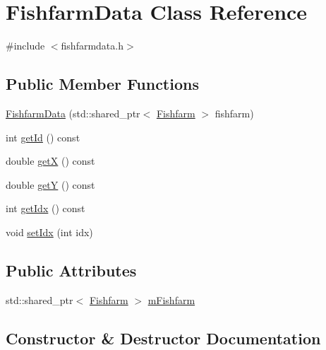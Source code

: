 \hypertarget{class_fishfarm_data}{}\section{Fishfarm\+Data Class Reference}
\label{class_fishfarm_data}


{\ttfamily \#include $<$fishfarmdata.\+h$>$}

\subsection*{Public Member Functions}
\begin{DoxyCompactItemize}
\item 
\mbox{\hyperlink{class_fishfarm_data_a05721893e565ef3870ab331159bc1b34}{Fishfarm\+Data}} (std\+::shared\+\_\+ptr$<$ \mbox{\hyperlink{class_fishfarm}{Fishfarm}} $>$ fishfarm)
\item 
int \mbox{\hyperlink{class_fishfarm_data_a712a5fa81604d4a888a6314b5e3decc2}{get\+Id}} () const
\item 
double \mbox{\hyperlink{class_fishfarm_data_acdaed3df25a88e94c7eaeb5dead7fba9}{getX}} () const
\item 
double \mbox{\hyperlink{class_fishfarm_data_a98adbc6e4567e9248c6b594a3fff7242}{getY}} () const
\item 
int \mbox{\hyperlink{class_fishfarm_data_a4a59751310f4142c90b62df12dcc85b9}{get\+Idx}} () const
\item 
void \mbox{\hyperlink{class_fishfarm_data_a2023a1d96ff75a5ae0eb2c076accd71b}{set\+Idx}} (int idx)
\end{DoxyCompactItemize}
\subsection*{Public Attributes}
\begin{DoxyCompactItemize}
\item 
std\+::shared\+\_\+ptr$<$ \mbox{\hyperlink{class_fishfarm}{Fishfarm}} $>$ \mbox{\hyperlink{class_fishfarm_data_a062fd5764caa6e2c9fb2dc19b0fe0c1d}{m\+Fishfarm}}
\end{DoxyCompactItemize}


\subsection{Constructor \& Destructor Documentation}
\mbox{\label{class_fishfarm_data_a05721893e565ef3870ab331159bc1b34}} 
